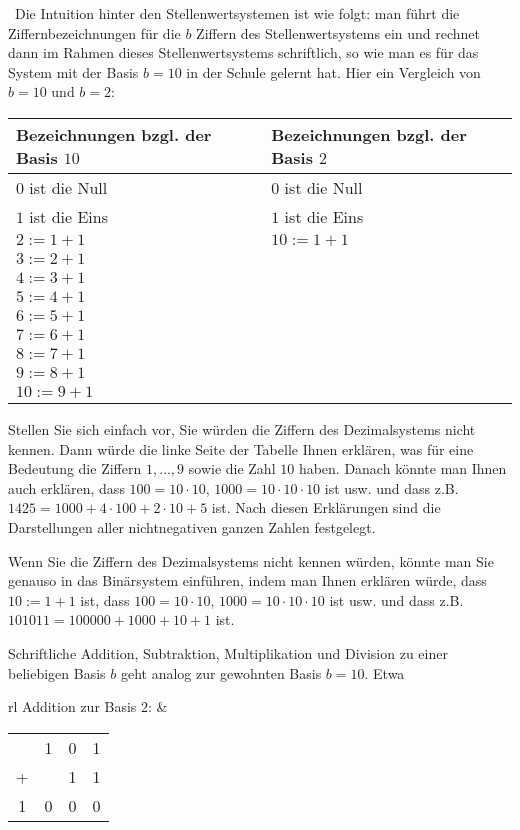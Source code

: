 \begin{bem}\
	Die Intuition hinter den Stellenwertsystemen ist wie folgt: man führt die Ziffernbezeichnungen für die $b$ Ziffern des Stellenwertsystems ein und rechnet dann im Rahmen dieses Stellenwertsystems \glqq schriftlich\grqq, so wie man es für das System mit der Basis $b=10$ in der Schule gelernt hat. Hier ein Vergleich von $b=10$ und $b=2$: 
	\begin{center} 
		\begin{tabular}{l|l} 
			Bezeichnungen bzgl. der Basis $10$ & Bezeichnungen bzgl. der Basis $2$ 
			\\ \hline $0$ ist die Null & $0$ ist die Null
			\\ $1$ ist die Eins & $1$ ist die Eins
			\\ $2:=1+1$ & $10:=1+1$
			\\ $3:=2+1$ & 
			\\ $4:=3+1$ & 
			\\ $5:=4+1$ & 
			\\ $6:=5+1$ & 
			\\ $7:= 6+1$ & 
			\\ $8:=7+1$ & 
			\\ $9:=8+1$ & 
			\\ $10:=9+1$  
		\end{tabular} 
	\end{center} 
	Stellen Sie sich einfach vor, Sie würden die Ziffern des Dezimalsystems nicht kennen. Dann würde die linke Seite der Tabelle Ihnen erklären, was für eine Bedeutung die Ziffern $1,\ldots,9$ sowie die Zahl $10$ haben. Danach könnte man Ihnen auch erklären, dass $100 = 10 \cdot 10$, $1000 = 10 \cdot 10 \cdot 10$ ist usw. und dass z.B. $1425 = 1000 + 4 \cdot 100 + 2 \cdot 10 + 5$ ist. Nach diesen Erklärungen sind die Darstellungen aller nichtnegativen ganzen Zahlen festgelegt. 
	
	Wenn Sie die Ziffern des Dezimalsystems nicht kennen würden, könnte man Sie genauso in das Binärsystem einführen, indem man Ihnen erklären würde, dass $10:=1+1$ ist, dass $100 = 10 \cdot 10$, $1000 = 10 \cdot 10 \cdot 10$ ist usw. und dass z.B. $101011= 100000 + 1000 + 10 + 1$ ist. 
\end{bem} 


\begin{bsp}
	Schriftliche Addition, Subtraktion, Multiplikation und Division zu einer beliebigen Basis $b$ geht analog zur gewohnten Basis $b=10$. Etwa
	\begin{center}
		\begin{tabular}{rl}
			Addition zur Basis $2$:\hspace{3em} &
			\begin{tabular}{cccc}
				& 1 & 0 & 1
				\\	+ & & 1 & 1
				\\ \hline
				1 & 0 & 0 & 0
			\end{tabular}
		\end{tabular}
	\end{center}
\end{bsp}


